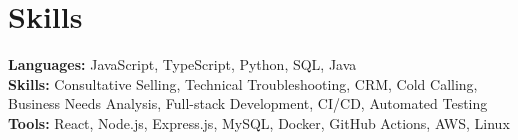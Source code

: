 \documentclass[11pt]{article}
\begin{document}
\vspace{-18.5pt}

\section*{Skills}
\textbf{Languages:} JavaScript, TypeScript, Python, SQL, Java\\
\textbf{Skills:} Consultative Selling, Technical Troubleshooting, CRM, Cold Calling, Business Needs Analysis, Full-stack Development, CI/CD, Automated Testing\\
\textbf{Tools:} React, Node.js, Express.js, MySQL, Docker, GitHub Actions, AWS, Linux

\vspace{-6.5pt}
\end{document}
